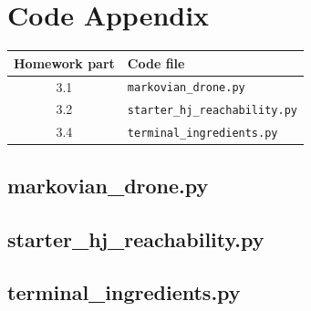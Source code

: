 \section*{Code Appendix}

\begin{tabular}{c|l}
Homework part & Code file\\
\hline
3.1 & \texttt{markovian\_drone.py}\\
3.2 & \texttt{starter\_hj\_reachability.py}\\
3.4 & \texttt{terminal\_ingredients.py}\\
\end{tabular}

\subsection*{markovian\_drone.py}
\label{markovian_drone}


\subsection*{starter\_hj\_reachability.py}
\label{hj_reachability}


% 

\subsection*{terminal\_ingredients.py}
\label{terminal_ingredients}

